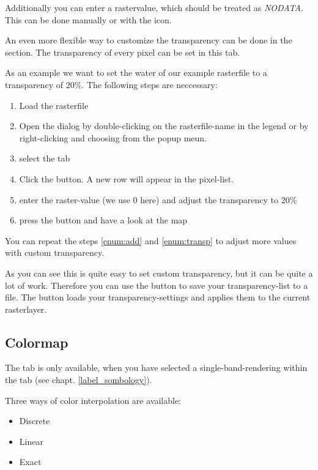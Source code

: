 Additionally you can enter a rastervalue, which should be treated as
{\em NODATA}. This can be done manually or with the 
 icon.

An even more flexible way to customize the transparency can be done in the
 section.
The transparency of every pixel can be set in this tab.

As an example we want to set the water of our example rasterfile
 to a transparency of 20\%. The following steps
are neccessary:
\begin{enumerate}
 \item  Load the rasterfile 
 \item Open the  dialog by double-clicking on the
 rasterfile-name in the legend or by right-clicking and choosing
  from the popup meun.
 \item select the  tab
 \item \label{enum:add} Click the 
 button. A new row will appear in the pixel-list.
 \item \label{enum:transp} enter the raster-value (we use 0 here) and adjust the
 transparency to 20\%
 \item press the  button and have a look at the map
\end{enumerate}

You can repeat the steps \ref{enum:add} and \ref{enum:transp} to adjust
more values with custom transparency.

As you can see this is quite easy to set custom transparency, but it can be
quite a lot of work. Therefore you can use the button
 to save your
transparency-list to a file. The button
 loads your
transparency-settings and applies them to the current rasterlayer.

\subsection{Colormap} \label{label_colormaptab}

The  tab is only available, when you have selected a
single-band-rendering within the tab  (see chapt. \ref{label_sombology}).

Three ways of color interpolation are available:
\begin{itemize}[label=--]
\item Discrete
\item Linear
\item Exact
\end{itemize}

